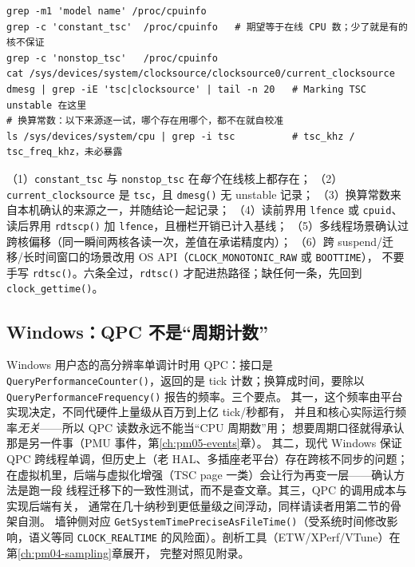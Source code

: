 \documentclass[12pt,a4paper,fontset=fandol]{ctexbook}
\newcommand{\Fn}[1]{\texttt{#1()}}
\newcommand{\Tp}[1]{\texttt{#1}}
\newcommand{\Bk}{\discretionary{}{}{}}
\begin{document}
\begin{lstlisting}[style=shellstyle, title={Linux：TSC 三性确认命令（形态示意，路径随内核变）}, label={lst:pm02-tsccheck}]
grep -m1 'model name' /proc/cpuinfo
grep -c 'constant_tsc'  /proc/cpuinfo   # 期望等于在线 CPU 数；少了就是有的核不保证
grep -c 'nonstop_tsc'   /proc/cpuinfo
cat /sys/devices/system/clocksource/clocksource0/current_clocksource
dmesg | grep -iE 'tsc|clocksource' | tail -n 20   # Marking TSC unstable 在这里
# 换算常数：以下来源逐一试，哪个存在用哪个，都不在就自校准
ls /sys/devices/system/cpu | grep -i tsc          # tsc_khz / tsc_freq_khz，未必暴露
\end{lstlisting}

\begin{bestpractice}[title={决定直接用 \Fn{rdtsc} 之前，逐项打勾}, label={box:pm02-tsc-rules}]
（1）\Tp{constant{\Bk}\_tsc} 与 \Tp{nonstop{\Bk}\_tsc} 在\emph{每个}在线核上都存在；
（2）\Tp{current{\Bk}\_clocksource} 是 \Tp{tsc}，且 \Fn{dmesg} 无 unstable 记录；
（3）换算常数来自本机确认的来源之一，并随结论一起记录；
（4）读前界用 \Tp{lfence} 或 \Tp{cpuid}、读后界用 \Fn{rdtscp} 加 \Tp{lfence}，且栅栏开销已计入基线；
（5）多线程场景确认过跨核偏移（同一瞬间两核各读一次，差值在承诺精度内）；
（6）跨 suspend/迁移/长时间窗口的场景改用 OS API（\Tp{CLOCK{\Bk}\_MONOTONIC{\Bk}\_RAW} 或 \Tp{BOOTTIME}），
不要手写 \Fn{rdtsc}。六条全过，\Fn{rdtsc} 才配进热路径；缺任何一条，先回到 \Fn{clock{\Bk}\_gettime}。
\end{bestpractice}

\subsection{Windows：QPC 不是``周期计数''}
\label{sub:pm02-qpc}

Windows 用户态的高分辨率单调计时用 QPC：接口是
\Fn{Query{\Bk}Performance{\Bk}Counter}，返回的是 tick 计数；换算成时间，要除以
\Fn{Query{\Bk}Performance{\Bk}Frequency} 报告的频率。三个要点。
其一，这个频率由平台实现决定，不同代硬件上量级从百万到上亿 tick/秒都有，
并且和核心实际运行频率\emph{无关}——所以 QPC 读数永远不能当``CPU 周期数''用；
想要周期口径就得承认那是另一件事（PMU 事件，第\ref{ch:pm05-events}章）。
其二，现代 Windows 保证 QPC 跨线程单调，但历史上（老 HAL、多插座老平台）存在跨核不同步的问题；
在虚拟机里，后端与虚拟化增强（TSC page 一类）会让行为再变一层——确认方法是跑一段
线程迁移下的一致性测试，而不是查文章。其三，QPC 的调用成本与实现后端有关，
通常在几十纳秒到更低量级之间浮动，同样请读者用第二节的骨架自测。
墙钟侧对应 \Fn{Get{\Bk}SystemTime{\Bk}Precise{\Bk}AsFileTime}（受系统时间修改影响，语义等同
\Tp{CLOCK{\Bk}\_REALTIME} 的风险面）。剖析工具（ETW/XPerf/VTune）在第\ref{ch:pm04-sampling}章展开，
完整对照见附录。
\end{document}
